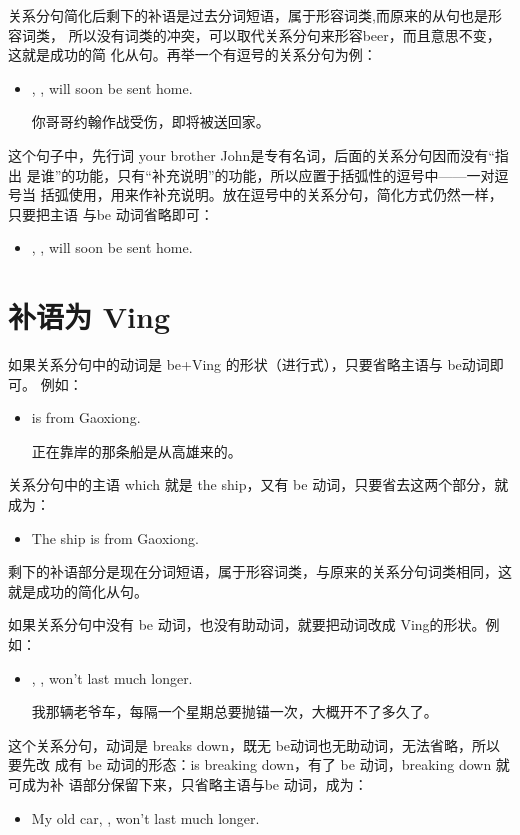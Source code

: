 关系分句简化后剩下的补语是过去分词短语，属于形容词类,而原来的从句也是形容词类，
所以没有词类的冲突，可以取代关系分句来形容beer，而且意思不变，这就是成功的简
化从句。再举一个有逗号的关系分句为例：
\begin{itemize}
\item {}, , will soon be sent home.

你哥哥约翰作战受伤，即将被送回家。
\end{itemize}
这个句子中，先行词 your brother John是专有名词，后面的关系分句因而没有“指出
是谁”的功能，只有“补充说明”的功能，所以应置于括弧性的逗号中——一对逗号当
括弧使用，用来作补充说明。放在逗号中的关系分句，简化方式仍然一样，只要把主语
与be 动词省略即可：
\begin{itemize}
\item {}, , will soon be sent home.
\end{itemize}

\section{补语为 Ving}

如果关系分句中的动词是 be+Ving 的形状（进行式），只要省略主语与 be动词即可。
例如：
\begin{itemize}
\item {}  is from Gaoxiong.

  正在靠岸的那条船是从高雄来的。
\end{itemize}
关系分句中的主语 which 就是 the ship，又有 be
动词，只要省去这两个部分，就成为：
\begin{itemize}
\item The ship  is from Gaoxiong.
\end{itemize}
剩下的补语部分是现在分词短语，属于形容词类，与原来的关系分句词类相同，这就是成功的简化从句。

如果关系分句中没有 be 动词，也没有助动词，就要把动词改成 Ving的形状。例如：
\begin{itemize}
\item {}, , won't last much longer.

  我那辆老爷车，每隔一个星期总要抛锚一次，大概开不了多久了。
\end{itemize}
这个关系分句，动词是 breaks down，既无 be动词也无助动词，无法省略，所以要先改
成有 be 动词的形态：is breaking down，有了 be 动词，breaking down 就可成为补
语部分保留下来，只省略主语与be 动词，成为：
\begin{itemize}
\item My old car, , won't last much longer.
\end{itemize}

